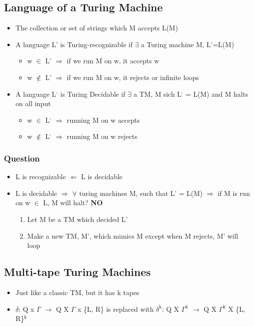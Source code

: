 \documentclass[11pt]{article}
\begin{document}
\subsection{Language of a Turing Machine}
\label{sec:orgef5dfdf}
\begin{itemize}
\item The collection or set of strings which M accepts L(M)
\item A language L' is Turing-recognizable if \(\exists\) a Turing machine M, L'=L(M)
\begin{itemize}
\item w \(\in\) L' \(\Rightarrow\) if we run M on w, it accepts w
\item w \(\notin\) L' \(\Rightarrow\) if we run M on w, it rejects or infinite loops
\end{itemize}
\item A language L\(^{\text{-}}\) is Turing Decidable if \(\exists\) a TM, M sich L\(^{\text{-}}\) = L(M) and M halts on all input
\begin{itemize}
\item w \(\in\) L\(^{\text{-}}\) \(\Rightarrow\) running M on w accepts
\item w \(\notin\) L\(^{\text{-}}\) \(\Rightarrow\) running M on w rejects
\end{itemize}
\end{itemize}
\subsubsection{Question}
\label{sec:org8a66615}
\begin{itemize}
\item L is recognizable \(\Leftarrow\) L is decidable
\item L is decidable \(\Rightarrow\) \(\forall\) turing machines M, such that L' = L(M) \(\Rightarrow\) if M is run on w \(\in\) L, M will halt? \textbf{NO}
\begin{enumerate}
\item Let M be a TM which decided L'
\item Make a new TM, M', which mimics M except when M rejects, M' will loop
\end{enumerate}
\end{itemize}
\subsection{Multi-tape Turing Machines}
\label{sec:orga99c884}
\begin{itemize}
\item Just like a classic TM, but it has k tapes
\item \(\delta\): Q x \(\Gamma\) \(\rightarrow\) Q X \(\Gamma\) x \{L, R\} is replaced with \(\delta^{\text{k}}\): Q X \(\Gamma^{\text{k}}\) \(\rightarrow\) Q X \(\Gamma^{\text{k}}\) X \{L, R\}\(^{\text{k}}\)
\end{itemize}
\end{document}
